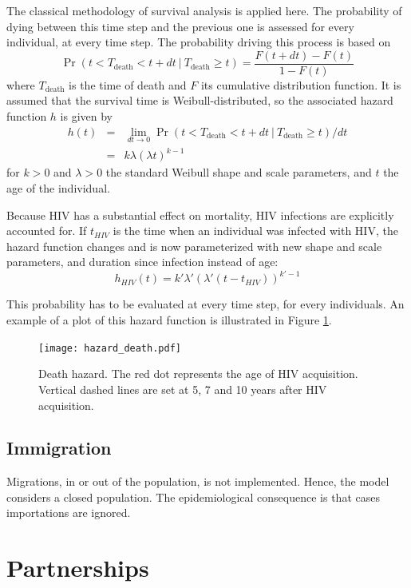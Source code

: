 \documentclass[11pt, onecolumn]{article}
\begin{document}
The classical methodology of survival analysis is applied here. The probability of dying between this time step and the previous one is assessed for every individual, at every time step. The probability driving this process is based on 
$$\Pr(t<T_{\mathrm{death}}<t+dt \ | \ T_{\mathrm{death}}\geq t) = \frac{F(t+dt)-F(t)}{1-F(t)}$$
where $T_{\mathrm{death}}$ is the time of death and $F$ its cumulative distribution function. It is assumed that the survival time is Weibull-distributed, so the associated hazard function $h$  is given by
\begin{eqnarray}
h(t) &=& \lim_{dt\to 0}\Pr(t<T_{\mathrm{death}}<t+dt \ | \ T_{\mathrm{death}}\geq t)/dt \\
 & =& k\lambda(\lambda t)^{k-1}
\end{eqnarray}
for $k>0$ and $\lambda>0$ the standard Weibull shape and scale parameters, and $t$ the age of the individual. 

Because HIV has a substantial effect on mortality, HIV infections are explicitly accounted for. If $t_{HIV}$ is the time when an individual was infected with HIV, the hazard function changes and is now parameterized with new shape and scale parameters, and duration since infection instead of age:
$$h_{HIV}(t) = k'\lambda'(\lambda' (t-t_{HIV}))^{k'-1}$$

This probability has to be evaluated at every time step, for every individuals. An example of a plot of this hazard function is illustrated in Figure \ref{fig:deathHazard}.

\begin{figure}[!ht]
\centering
    \texttt{[image: hazard\_death.pdf]}
\caption{Death hazard. The red dot represents the age of HIV acquisition. Vertical dashed lines are set at 5, 7 and 10 years after HIV acquisition.}
\label{fig:deathHazard}
\end{figure}


\subsection{Immigration}
Migrations, in or out of the population, is not implemented. Hence, the model considers a closed population. The epidemiological consequence is that cases importations are ignored. 





\section{Partnerships}
\end{document}
